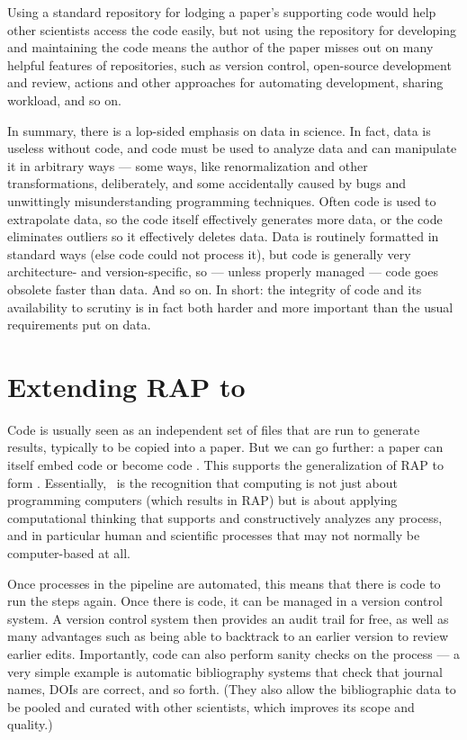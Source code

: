 \documentclass{comjnl}
\begin{document}
Using a standard repository for lodging a paper's supporting code would help other scientists access the code easily, but not using the repository for developing and maintaining the code means the author of the paper misses out on many helpful features of repositories, such as version control, open-source development and review, actions and other approaches for automating development, sharing workload, and so on.

In summary, there is a lop-sided emphasis on data in science. In fact, data is useless without code, and code must be used to analyze data and can manipulate it in arbitrary ways --- some ways, like renormalization and other transformations, deliberately, and some accidentally caused by bugs and unwittingly misunderstanding programming techniques. Often code is used to extrapolate data, so the code itself effectively generates more data, or the code eliminates outliers so it effectively deletes data. Data is routinely formatted in standard ways (else code could not process it), but code is generally very architecture- and version-specific, so --- unless properly managed --- code goes obsolete faster than data. And so on. In short: the integrity of code and its availability to scrutiny is in fact both harder and more important than the usual requirements put on data.

\section{Extending RAP to \RAPstar}\label{RAPstar-section}
Code is usually seen as an independent set of files that are run to generate results, typically to be copied into a paper. But we can go further: a paper can itself embed code or become code . This supports the generalization of RAP to form \RAPstarp. Essentially, \RAPstar\ is the recognition that computing is not just about programming computers (which results in RAP) but is about applying computational thinking \cite{computational-thinking-wing,computational-thinking} that supports and constructively analyzes any process, and in particular human and scientific processes that may not normally be computer-based at all.

Once processes in the pipeline are automated, this means that there is code to run the steps again. Once there is code, it can be managed in a version control system. A version control system then provides an audit trail for free, as well as many advantages such as being able to backtrack to an earlier version to review earlier edits. Importantly, code can also perform sanity checks on the process --- a very simple example is automatic bibliography systems that check that journal names, DOIs are correct, and so forth. (They also allow the bibliographic data to be pooled and curated with other scientists, which improves its scope and quality.)
\end{document}
